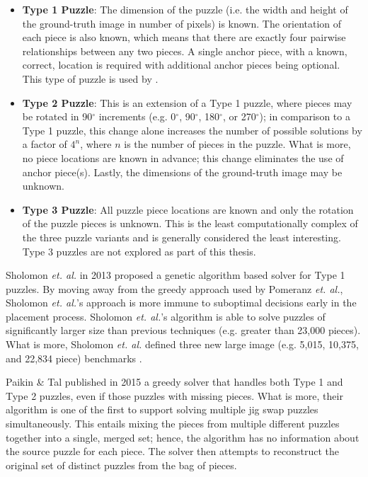 \documentclass{report}
\newcommand{\numbwithdegreesymbol}[1]{#1$^\circ$}
\begin{document}
\begin{itemize}

	\item \textbf{Type 1 Puzzle}: The dimension of the puzzle (i.e. the width and height of the ground-truth image in number of pixels) is known.  The orientation of each piece is also known, which means that there are exactly four pairwise relationships between any two pieces.  A single anchor piece, with a known, correct, location is required with additional anchor pieces being optional.  This type of puzzle is used by \cite{cho2010, pomeranz2011}.
	
	\item \textbf{Type 2 Puzzle}: This is an extension of a Type 1 puzzle, where pieces may be rotated in \numbwithdegreesymbol{90} increments (e.g. \numbwithdegreesymbol{0}, \numbwithdegreesymbol{90}, \numbwithdegreesymbol{180}, or \numbwithdegreesymbol{270}); in comparison to a Type 1 puzzle, this change alone increases the number of possible solutions by a factor of $4^n$, where $n$ is the number of pieces in the puzzle.  What is more, no piece locations are known in advance; this change eliminates the use of anchor piece(s).  Lastly, the dimensions of the ground-truth image may be unknown.
	
	\item \textbf{Type 3 Puzzle}: All puzzle piece locations are known and only the rotation of the puzzle pieces is unknown.  This is the least computationally complex of the three puzzle variants and is generally considered the least interesting.  Type 3 puzzles are not explored as part of this thesis.

\end{itemize}

Sholomon \textit{et. al.} \cite{sholomon2013} in 2013 proposed a genetic algorithm based solver for Type 1 puzzles.  By moving away from the greedy approach used by Pomeranz \textit{et. al.}, Sholomon \textit{et. al.}'s approach is more immune to suboptimal decisions early in the placement process. Sholomon \textit{et. al.}'s algorithm is able to solve puzzles of significantly larger size than previous techniques (e.g. greater than 23,000 pieces).  What is more, Sholomon \textit{et. al.} defined three new large image (e.g. 5,015, 10,375, and 22,834 piece) benchmarks \cite{sholomonBenchmarkImages}.

Paikin \& Tal \cite{paikin2015} published in 2015 a greedy solver that handles both Type 1 and Type 2 puzzles, even if those puzzles with missing pieces.  What is more, their algorithm is one of the first to support solving multiple jig swap puzzles simultaneously.  This entails mixing the pieces from multiple different puzzles together into a single, merged set; hence, the algorithm has no information about the source puzzle for each piece.  The solver then attempts to reconstruct the original set of distinct puzzles from the bag of pieces.
\end{document}
